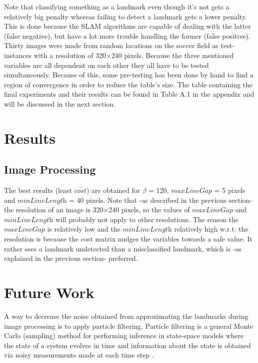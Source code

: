 \documentclass{ba-kecs}
\numberwithin{figure}{section}
\numberwithin{equation}{section}
\begin{document}
Note that classifying something as a landmark even though it's not gets a relatively big penalty whereas failing to detect a landmark gets a lower penalty. This is done because the SLAM algorithms are capable of dealing with the latter (false negative), but have a lot more trouble handling the former (false positive). \\
Thirty images were made from random locations on the soccer field as test-instances with a resolution of 320$\times$240 pixels.
Because the three mentioned variables are all dependent on each other they all have to be tested simultaneously. Because of this, some pre-testing has been done by hand to find a region of convergence in order to reduce the table's size. The table containing the final experiments and their results can be found in Table A.1 in the appendix and will be discussed in the next section.


\section{Results}

\subsection{Image Processing}
The best results (least $\overline{\textit{cost}}$) are obtained for $\beta$ = 120,  $\textit{maxLineGap}$ = 5 pixels and $\textit{minLineLength}$ = 40 pixels. Note that -as described in the previous section- the resolution of an image is 320$\times$240 pixels, so the values of $\textit{maxLineGap}$ and $\textit{minLineLength}$ will probably not apply to other resolutions.
The reason the $\textit{maxLineGap}$ is relatively low and the $\textit{minLineLength}$ relatively high w.r.t. the resolution is because the cost matrix nudges the variables towards a safe value. It rather sees a landmark undetected than a misclassified landmark, which is -as explained in the previous section- preferred.



\section{Future Work}
	A way to decrease the noise obtained from approximating the landmarks during image processing is to apply particle filtering. Particle filtering is a general Monte Carlo (sampling) method for performing inference in
state-space models where the state of a system evolves in time and information about the state is obtained via noisy measurements made at each time step \cite{ParFil}. \\
\end{document}

